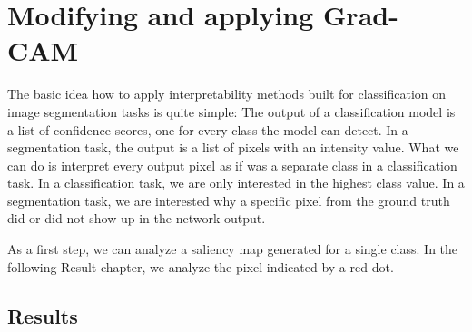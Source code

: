\section{Modifying and applying Grad-CAM}

The basic idea how to apply interpretability methods built for classification on image segmentation tasks is quite simple: The output of a classification model
is a list of confidence scores, one for every class the model can detect. In a segmentation task, the output is a list of pixels with an intensity value.
What we can do is interpret every output pixel as if was a separate class in a classification task.
In a classification task, we are only interested in the highest class value. In a segmentation task, we are interested why a specific pixel from the ground truth did
or did not show up in the network output.

As a first step, we can analyze a saliency map generated for a single class. In the following Result chapter, we analyze the pixel indicated by a red dot.

\subsection{Results}

